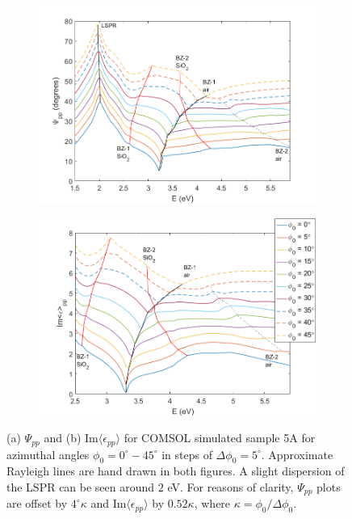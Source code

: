 \begin{figure}[h!] %
    \begin{subfigure}{0.5\textwidth}
        \centering
        \includegraphics[width=\linewidth, trim=1cm 0cm 0cm 0cm, clip]{figures/ch4/S5A/S5A_Psipp_phi=0-45_offset4(1).png}
        \label{}
    \end{subfigure}
    \begin{subfigure}{0.5\textwidth}
        \centering
        \includegraphics[width=\linewidth, trim=1cm 0cm 0cm 0cm, clip]{figures/ch4/S5A/S5A_ImEpsilon_phi=0-45_offset052(2).png}
        \label{}
    \end{subfigure}
    \label{fig:S5A_Psi_Imeps_stacked}
    \caption{(a) $\Psi_{pp}$ and (b) Im$\langle\epsilon_{pp}\rangle$ for COMSOL simulated sample 5A for azimuthal angles $\phi_0 = 0^\circ-45^\circ$ in steps of $\Delta\phi_0=5^\circ$. Approximate Rayleigh lines are hand drawn in both figures. A slight dispersion of the LSPR can be seen around $2$ eV. For reasons of clarity, $\Psi_{pp}$ plots are offset by $4^\circ\kappa$ and Im$\langle\epsilon_{pp}\rangle$ by $0.52\kappa$, where $\kappa=\phi_0/\Delta\phi_0$.}
    \label{fig:S5A_stacked_PsippImeps}
\end{figure} 

